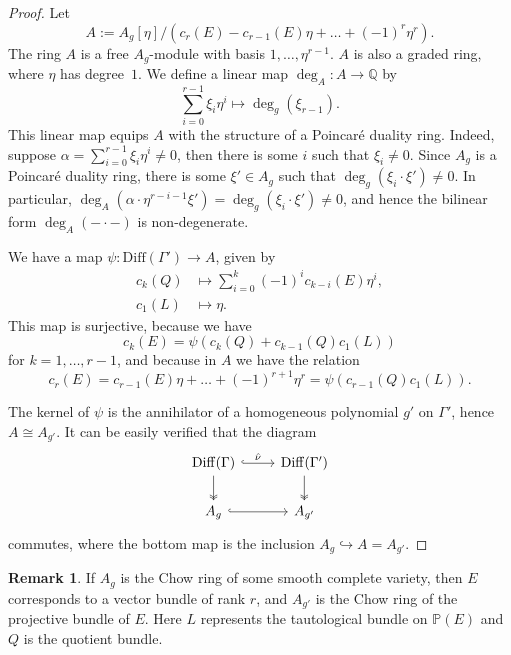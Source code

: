 \documentclass[oneside]{amsart}
\theoremstyle{plain}
\theoremstyle{definition}
\newtheorem{remark}[theorem]{Remark}
\newcommand{\Q}{{\mathbb{Q}}}
\newcommand{\Diff}{{\mathrm{Diff}}}
\begin{document}
\begin{proof}
    Let \[A := A_g[\eta]/(c_r(E) - c_{r-1}(E)\eta + \dots + (-1)^r\eta^r).\]
    The ring $A$ is a free $A_g$-module with basis $1, \dots, \eta^{r-1}$. $A$ is also a graded ring, where $\eta$ has degree~$1$. We define a linear map $\deg_A: A \to \Q$ by
    \[
        \sum_{i = 0}^{r - 1}\xi_i \eta^i \mapsto \deg_g(\xi_{r-1}).
    \]
    This linear map equips $A$ with the structure of a Poincar\'e duality ring.
    Indeed, suppose $\alpha = \sum_{i = 0}^{r-1} \xi_i \eta^i \neq 0$, then there is some $i$ such that $\xi_i \neq 0$. Since $A_g$ is a Poincar\'e duality ring, there is some $\xi' \in A_g$ such that $\deg_g(\xi_i \cdot \xi') \neq 0$. In particular,
    $\deg_A(\alpha \cdot \eta^{r - i - 1} \xi') = \deg_g(\xi_i \cdot \xi') \neq 0$, and hence the bilinear form $\deg_A(-\cdot -)$ is non-degenerate.
    
    We have a map $\psi: \Diff(\Gamma') \to A$, given by
    \begin{align*}    
        c_k(Q) &\mapsto \sum_{i = 0}^k (-1)^i c_{k - i}(E) \eta^i,\\
        c_1(L) &\mapsto \eta.
    \end{align*}
    This map is surjective, because we have
    \[
        c_k(E) = \psi(c_k(Q) + c_{k-1}(Q)c_1(L))
    \]
    for $k = 1, \dots, r-1$, and because in $A$ we have the relation 
    \[
        c_r(E) = c_{r-1}(E)\eta + \dots + (-1)^{r+1}\eta^r = \psi(c_{r-1}(Q)c_1(L)).
    \]
    
    The kernel of $\psi$ is the annihilator of a homogeneous polynomial $g'$ on $\Gamma'$, hence $A \cong A_{g'}$.
    It can be easily verified that the diagram
    \[
    \begin{tikzcd}
    \Diff(\Gamma) \arrow[d, two heads] \arrow[r, "\hat \nu", hook] & \Diff(\Gamma') \arrow[d, two heads] \\
    A_g \arrow[r, hook]                                         & A_{g'}                                 
    \end{tikzcd}
    \]
    commutes, where the bottom map is the inclusion $A_g \hookrightarrow A = A_{g'}$.
\end{proof}

\begin{remark}
    If $A_g$ is the Chow ring of some smooth complete variety, then $E$ corresponds to a vector bundle of rank $r$, and $A_{g'}$ is the Chow ring of the projective bundle of $E$. Here $L$ represents the tautological bundle on $\mathbb{P}(E)$ and $Q$ is the quotient bundle.
\end{remark}
\end{document}
